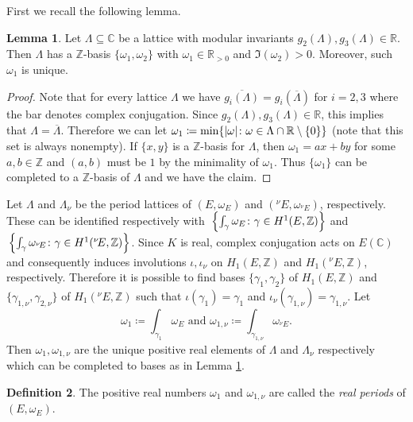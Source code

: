 \documentclass[11pt]{amsart}
\theoremstyle{definition}
\newtheorem{definizione}{Definition}[section]
\newtheorem{lem}[definizione]{Lemma}
\begin{document}
		First we recall the following lemma.
			\begin{lem} \label{reallattice}
				Let $\Lambda{\subseteq} {\mathbb{C}}$ be a lattice with modular invariants $g_2(\Lambda),g_3(\Lambda)\in {\mathbb{R}}$. Then $\Lambda$ has a ${\mathbb{Z}}$-basis $\{\omega_1,\omega_2\}$ with $\omega_1\in {\mathbb{R}}_{>0}$ and $\Im (\omega_2)>0$. Moreover, such $\omega_1$ is unique.
		\end{lem}
			\begin{proof}
				Note that for every lattice $\Lambda$ we have $\overline{g_i(\Lambda)}=g_i(\overline{\Lambda})$ for $i=2,3$ where the bar denotes complex conjugation. Since $g_2(\Lambda),g_3(\Lambda)\in {\mathbb{R}}$, this implies that $\Lambda=\overline{\Lambda}$. Therefore we can let ${\displaystyle} \omega_1\coloneqq\min\{|\omega|\colon\omega\in \Lambda\cap {\mathbb{R}}\setminus\{0\}\}$ (note that this set is always nonempty). If $\{x,y\}$ is a ${\mathbb{Z}}$-basis for $\Lambda$, then $\omega_1=ax+by$ for some $a,b\in {\mathbb{Z}}$ and $(a,b)$ must be $1$ by the minimality of $\omega_1$. Thus $\{\omega_1\}$ can be completed to a ${\mathbb{Z}}$-basis of $\Lambda$ and we have the claim.
		\end{proof}
		Let $\Lambda$ and $\Lambda_{\nu}$ be the period lattices of $(E,\omega_E)$ and $({{}^\nu\!} E,\omega_{{{}^\nu\!} E})$, respectively. These can be identified respectively with ${\displaystyle}\left\{\int_{\gamma}\omega_E\colon \gamma\in H^1(E,{\mathbb{Z}})\right\}$ and ${\displaystyle}\left\{\int_{\gamma}\omega_{{{}^\nu\!} E}\colon \gamma\in H^1({{}^\nu\!} E,{\mathbb{Z}})\right\}$. Since $K$ is real, complex conjugation acts on $E({\mathbb{C}})$ and consequently induces involutions $\iota,\iota_{\nu}$ on $H_1(E,{\mathbb{Z}})$ and $H_1({{}^\nu\!} E,{\mathbb{Z}})$, respectively. Therefore it is possible to find bases $\{\gamma_1,\gamma_2\}$ of $H_1(E,{\mathbb{Z}})$ and $\{\gamma_{1,\nu},\gamma_{2,\nu}\}$ of $H_1({{}^\nu\!} E,{\mathbb{Z}})$ such that $\iota(\gamma_1)=\gamma_1$ and $\iota_{\nu}(\gamma_{1,\nu})=\gamma_{1,\nu}$. Let
		$$\omega_1\coloneqq \int_{\gamma_1}\omega_E\mbox{ and }\omega_{1,\nu}\coloneqq \int_{\gamma_{1,\nu}}\omega_{{{}^\nu\!} E}.$$
		Then $\omega_1,\omega_{1,\nu}$ are the unique positive real elements of $\Lambda$ and $\Lambda_{\nu}$ respectively which can be completed to bases as in Lemma \ref{reallattice}.
			\begin{definizione}
				The positive real numbers $\omega_1$ and $\omega_{1,\nu}$ are called the \emph{real periods} of $(E,\omega_E)$.
		\end{definizione}
\end{document}

